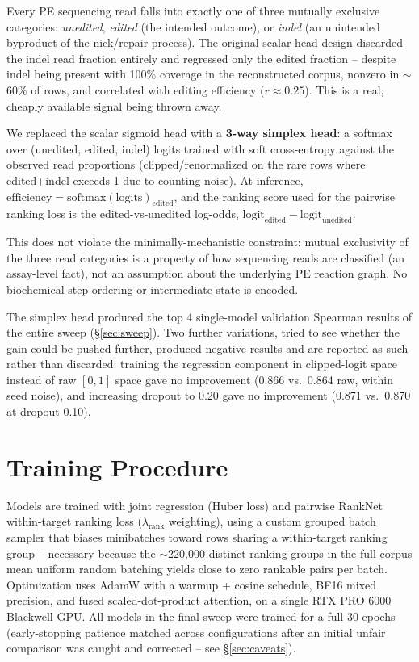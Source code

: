 \documentclass[11pt]{article}
\begin{document}
Every PE sequencing read falls into exactly one of three mutually exclusive
categories: \emph{unedited}, \emph{edited} (the intended outcome), or
\emph{indel} (an unintended byproduct of the nick/repair process). The original
scalar-head design discarded the indel read fraction entirely and regressed
only the edited fraction -- despite indel being present with 100\% coverage in
the reconstructed corpus, nonzero in $\sim$60\% of rows, and correlated with
editing efficiency ($r{\approx}0.25$). This is a real, cheaply available signal
being thrown away.

We replaced the scalar sigmoid head with a \textbf{3-way simplex head}: a
softmax over (unedited, edited, indel) logits trained with soft cross-entropy
against the observed read proportions (clipped/renormalized on the rare rows
where edited+indel exceeds 1 due to counting noise). At inference,
$\text{efficiency} = \text{softmax}(\text{logits})_{\text{edited}}$, and the
ranking score used for the pairwise ranking loss is the edited-vs-unedited
log-odds, $\text{logit}_{\text{edited}} - \text{logit}_{\text{unedited}}$.

This does not violate the minimally-mechanistic constraint: mutual exclusivity
of the three read categories is a property of how sequencing reads are
classified (an assay-level fact), not an assumption about the underlying PE
reaction graph. No biochemical step ordering or intermediate state is encoded.

The simplex head produced the top 4 single-model validation Spearman results
of the entire sweep (\S\ref{sec:sweep}). Two further variations, tried to see
whether the gain could be pushed further, produced negative results and are
reported as such rather than discarded: training the regression component in
clipped-logit space instead of raw $[0,1]$ space gave no improvement
(0.866 vs.\ 0.864 raw, within seed noise), and increasing dropout to 0.20
gave no improvement (0.871 vs.\ 0.870 at dropout 0.10).

\section{Training Procedure}

Models are trained with joint regression (Huber loss) and pairwise RankNet
within-target ranking loss ($\lambda_{\text{rank}}$ weighting), using a custom
grouped batch sampler that biases minibatches toward rows sharing a
within-target ranking group -- necessary because the $\sim$220{,}000 distinct
ranking groups in the full corpus mean uniform random batching yields close to
zero rankable pairs per batch. Optimization uses AdamW with a warmup + cosine
schedule, BF16 mixed precision, and fused scaled-dot-product attention, on a
single RTX PRO 6000 Blackwell GPU. All models in the final sweep were trained
for a full 30 epochs (early-stopping patience matched across configurations
after an initial unfair comparison was caught and corrected -- see
\S\ref{sec:caveats}).
\end{document}
